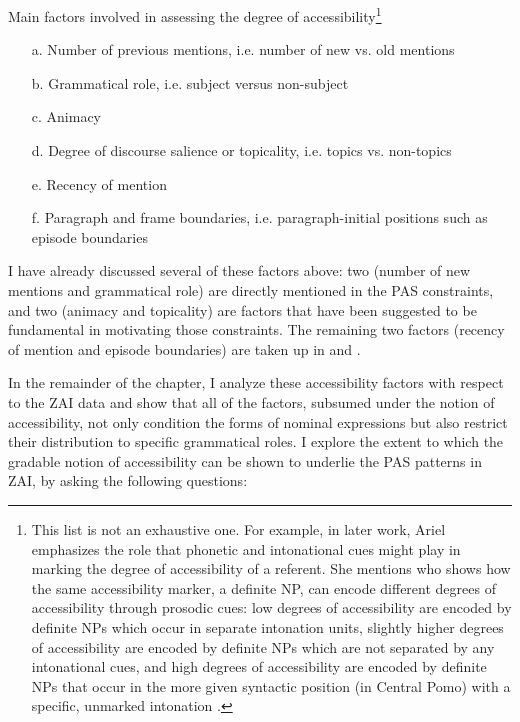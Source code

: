 \ea\label{accessibilityfactors}  Main factors involved in assessing the degree of accessibility\footnote{This list is not an exhaustive one. For example, in later work, Ariel emphasizes the role that phonetic and intonational cues might play in marking the degree of accessibility of a referent. She mentions \citet{mithun1995} who shows how the same accessibility marker, a definite NP, can encode different degrees of accessibility through prosodic cues: low degrees of accessibility are encoded by definite NPs which occur in separate intonation units, slightly higher degrees of accessibility are encoded by definite NPs which are not separated by any intonational cues, and high degrees of accessibility are encoded by definite NPs that occur in the more given syntactic position (in Central Pomo) with a specific, unmarked intonation \citep[50]{ariel2001}.} \citep{ariel1990,ariel2001}

\begin{itemize}
\item[a.] Number of previous mentions, i.e. number of new vs. old mentions
\item[b.] Grammatical role, i.e. subject versus non-subject
\item[c.] Animacy
\item[d.] Degree of discourse salience or topicality, i.e. topics vs. non-topics 
\item[e.] Recency of mention
\item[f.] Paragraph and frame boundaries, i.e. paragraph-initial positions such as episode boundaries
\end{itemize}
\z
 
I have already discussed several of these factors above: two (number of new mentions and grammatical role) are directly mentioned in the PAS constraints, and two (animacy and topicality) are factors that have been suggested \citep{haspelmath2006,everett2009} to be fundamental in motivating those constraints. The remaining two factors (recency of mention and episode boundaries) are taken up in  and . 

In the remainder of the chapter, I analyze these accessibility factors with respect to the ZAI data and show that all of the factors, subsumed under the notion of accessibility, not only condition the forms of nominal expressions but also restrict their distribution to specific grammatical roles. I explore the extent to which the gradable notion of accessibility can be shown to underlie the PAS patterns in ZAI, by asking the following questions:

